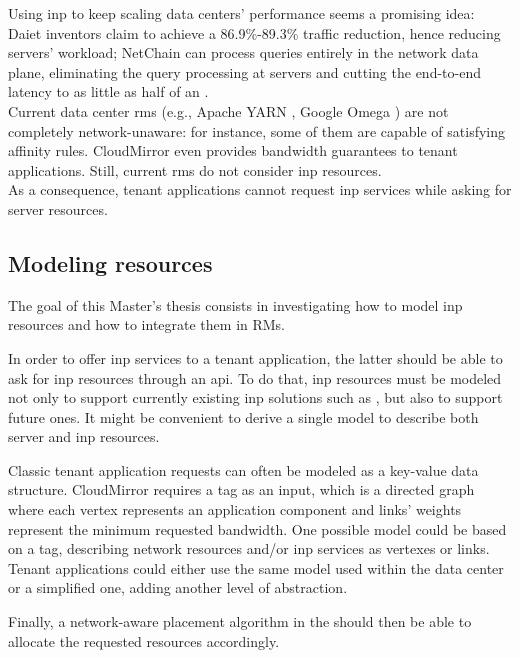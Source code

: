 Using \gls{inp} to keep scaling data centers' performance seems a promising idea: Daiet \cite{daiet} inventors claim to achieve a 86.9\%-89.3\% traffic reduction, hence reducing servers' workload; NetChain \cite{netchain} can process queries entirely in the network data plane, eliminating the query processing at servers and cutting the end-to-end latency to as little as half of an .\\
Current data center \glspl{rm} (e.g., Apache YARN \cite{yarn}, Google Omega \cite{omega}) are not completely network-unaware: for instance, some of them are capable of satisfying affinity rules. CloudMirror \cite{cloudmirror} even provides bandwidth guarantees to tenant applications. Still, current \glspl{rm} do not consider \gls{inp} resources.\\
As a consequence, tenant applications cannot request \gls{inp} services while asking for server resources.

\subsection{Modeling \texorpdfstring{}{INP} resources}
The goal of this Master's thesis consists in investigating how to model \gls{inp} resources and how to integrate them in RMs.\par
In order to offer \gls{inp} services to a tenant application, the latter should be able to ask for \gls{inp} resources through an \gls{api}. To do that, \gls{inp} resources must be modeled not only to support currently existing \gls{inp} solutions such as \cite{daiet} \cite{netchain} \cite{incbricks} \cite{sharp}, but also to support future ones. It might be convenient to derive a single model to describe both server and \gls{inp} resources.\par
Classic tenant application requests can often be modeled as a key-value data structure. CloudMirror \cite{cloudmirror} requires a \gls{tag} as an input, which is a directed graph where each vertex represents an application component and links' weights represent the minimum requested bandwidth. One possible model could be based on a \gls{tag}, describing network resources and/or \gls{inp} services as vertexes or links. Tenant applications could either use the same model used within the data center or a simplified one, adding another level of abstraction.\par
{}
Finally, a network-aware placement algorithm in the  should then be able to allocate the requested resources accordingly.